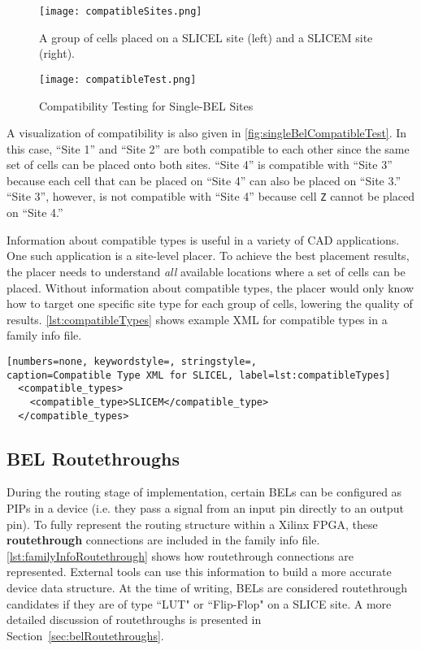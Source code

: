 \begin{figure}[h!]
  \centering
  \texttt{[image: compatibleSites.png]}
  \caption{A group of cells placed on a SLICEL site (left) and a SLICEM
  site (right).}
  \label{fig:sliceCompatibility}
\end{figure}

\begin{figure}[b!]
  \centering
  \texttt{[image: compatibleTest.png]}
  \caption{Compatibility Testing for Single-BEL Sites}
  \label{fig:singleBelCompatibleTest}
\end{figure}

A visualization of compatibility is also given in
\autoref{fig:singleBelCompatibleTest}. In this case, ``Site 1'' and ``Site 2''
are both compatible to each other since the same set of cells can be placed
onto both sites. ``Site 4'' is compatible with ``Site 3'' because each cell that
can be placed on ``Site 4'' can also be placed on ``Site 3.'' ``Site 3'', however, is
not compatible with ``Site 4'' because cell \texttt{Z} cannot be placed on
``Site 4.''

Information about compatible types is useful in a variety of CAD applications.
One such application is a site-level placer. To achieve the best
placement results, the placer needs to understand \emph{all} available
locations where a set of cells can be placed. Without information about
compatible types, the placer would only know how to target one specific site
type for each group of cells, lowering the quality of results.
\autoref{lst:compatibleTypes} shows example XML for compatible types in a
family info file.

\begin{lstlisting}[numbers=none, keywordstyle=, stringstyle=,
caption=Compatible Type XML for SLICEL, label=lst:compatibleTypes]
  <compatible_types>
    <compatible_type>SLICEM</compatible_type>
  </compatible_types>
\end{lstlisting}

\subsection{BEL Routethroughs}
During the routing stage of implementation, certain BELs can be configured as
PIPs in a device (i.e. they pass a signal from an input pin directly to an
output pin). To fully represent the routing structure within
a Xilinx FPGA, these \textbf{routethrough} connections are included in the
family info file. \autoref{lst:familyInfoRoutethrough} shows how routethrough
connections are represented. External tools can use this information to
build a more accurate device data structure. At the time of writing, BELs are
considered routethrough candidates if they are of type ``LUT" or ``Flip-Flop"
on a SLICE site. A more detailed discussion of routethroughs is presented in
Section~\ref{sec:belRoutethroughs}.

